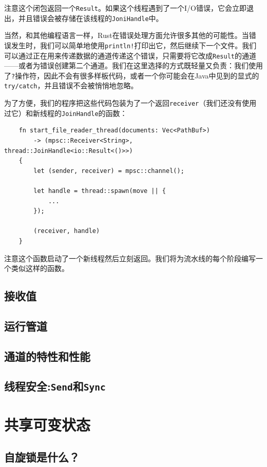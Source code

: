 注意这个闭包返回一个\texttt{Result}。如果这个线程遇到了一个I/O错误，它会立即退出，并且错误会被存储在该线程的\texttt{JoniHandle}中。

当然，和其他编程语言一样，Rust在错误处理方面允许很多其他的可能性。当错误发生时，我们可以简单地使用\texttt{println!}打印出它，然后继续下一个文件。我们可以通过正在用来传递数据的通道传递这个错误，只需要将它改成\texttt{Result}的通道——或者为错误创建第二个通道。我们在这里选择的方式既轻量又负责：我们使用了\texttt{?}操作符，因此不会有很多样板代码，或者一个你可能会在Java中见到的显式的\texttt{try/catch}，并且错误不会被悄悄地忽略。

为了方便，我们的程序把这些代码包装为了一个返回\texttt{receiver}（我们还没有使用过它）和新线程的\texttt{JoinHandle}的函数：
\begin{verbatim}
    fn start_file_reader_thread(documents: Vec<PathBuf>)
        -> (mpsc::Receiver<String>, thread::JoinHandle<io::Result<()>>)
    {
        let (sender, receiver) = mpsc::channel();

        let handle = thread::spawn(move || {
            ...
        });

        (receiver, handle)
    }
\end{verbatim}

注意这个函数启动了一个新线程然后立刻返回。我们将为流水线的每个阶段编写一个类似这样的函数。

\subsection{接收值}

\subsection{运行管道}

\subsection{通道的特性和性能}

\subsection{线程安全:\texttt{Send}和\texttt{Sync}}\label{threadsafe}

\section{共享可变状态}

\subsection{自旋锁是什么？}

